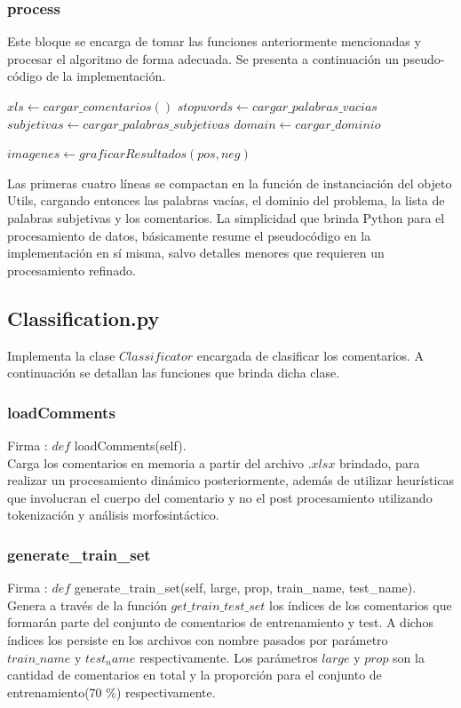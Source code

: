 \documentclass[12pt]{article}
\begin{document}
\subsubsection{process}
Este bloque se encarga de tomar las funciones anteriormente mencionadas y procesar el algoritmo de forma adecuada.
Se presenta a continuación un pseudo-código de la implementación.



\begin{algorithmic}
  \State $xls \gets cargar\_comentarios()$
  \State $stopwords \gets cargar\_palabras\_vacias$
  \State $subjetivas \gets cargar\_palabras\_subjetivas$
  \State $domain \gets cargar\_dominio$
  
     \EndFor
  \EndFor
  
  \State $imagenes \gets graficarResultados(pos, neg)$
\end{algorithmic}
Las primeras cuatro líneas se compactan en la función de instanciación del objeto Utils, cargando entonces las palabras vacías, el dominio del problema, la lista de palabras subjetivas y los comentarios.
La simplicidad que brinda Python para el procesamiento de datos, básicamente resume el pseudocódigo en la implementación en sí misma, salvo detalles menores que requieren un procesamiento refinado.

\subsection{Classification.py}
Implementa la clase $Classificator$ encargada de clasificar los comentarios. A continuación se detallan las funciones que brinda dicha clase.

\subsubsection{loadComments}
Firma : $def$ loadComments(self). \\
Carga los comentarios en memoria a partir del archivo $.xlsx$ brindado, para realizar un procesamiento dinámico posteriormente, además de utilizar heurísticas que involucran el cuerpo del comentario y no el post procesamiento utilizando tokenización y análisis morfosintáctico.

\subsubsection{generate\_train\_set}
Firma : $def$ generate\_train\_set(self, large, prop, train\_name, test\_name). \\
Genera a través de la función $get\_train\_test\_set$ los índices de los comentarios que formarán parte del conjunto de comentarios de entrenamiento y test. A dichos índices los persiste en los archivos con nombre pasados por parámetro $train\_name$ y $test_name$ respectivamente. Los parámetros $large$ y $prop$ son la cantidad de comentarios en total y la proporción para el conjunto de entrenamiento(70 \%) respectivamente.
\end{document}
